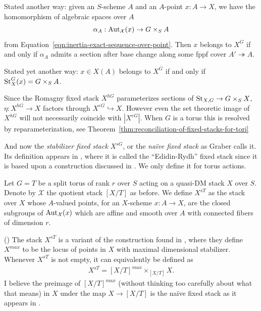 \documentclass[12pt,dvipsnames]{amsart}
\begin{document}
\begin{remark}\label{rl-001D}
  Stated another way: given an \(S\)-scheme \(A\) and an \(A\)-point \(x:A\to X\), we have the homomorphism of algebraic spaces over \(A\)
  \[\alpha_A:\operatorname{Aut}_{\mathcal X}(x) \to G\times_SA\]
  from Equation~\ref{eqn:inertia-exact-sequence-over-point}. Then \(x\) belongs to \(X^G\) if and only if \(\alpha_A\) admits a section after base change along some fppf cover \(A' \twoheadrightarrow A\).

  \bigskip
  
  \noindent Stated yet another way: \(x\in X(A)\) belongs to \(X^G\) if and only if \(\operatorname{St}^G_X(x) = G\times_S A\).
\end{remark}


Since the Romagny fixed stack $X^{hG}$ parameterizes sections of \(\operatorname{St}_{X,G} \to G\times_SX\), \(\eta:X^{hG} \to X\) factors through \(X^{eG}\hookrightarrow X\). However even the set theoretic image of \(X^{hG}\) will not necessarily coincide with \(|X^{eG}|\). When \(G\) is a torus this is resolved by reparameterization, see Theorem~\ref{thm:reconciliation-of-fixed-stacks-for-tori}


And now the \textit{stabilizer fixed stack} \(X^{sG}\), or the \textit{na\"ive fixed stack} as Graber calls it. Its definition appears in \cite{aranha-khan-latyntsev-etal_VirtualLocalizationRevisited2025}, where it is called the ``Edidin-Rydh'' fixed stack since it is based upon a construction discussed in \cite{edidin-rydh_CanonicalReductionStabilizers2021}. We only define it for torus actions.

\begin{definition}\label{rl-001E}\label{def:stabilizer-fixed-stack}
  Let \(G = T\) be a split torus of rank \(r\) over \(S\) acting on a quasi-DM stack \(X\) over \(S\). Denote by \(\mathcal X\) the quotient stack \([X/T]\) as before. We define \(X^{sT}\) as the stack over \(X\) whose \(A\)-valued points, for an \(X\)-scheme \(x:A\to X\), are the closed subgroups of \(\operatorname{Aut}_{\mathcal X}(x)\) which are affine and smooth over \(A\) with connected fibers of dimension \(r\).
\end{definition}

\begin{remark}\label{rl-001F}
(\cite[Remark A.44]{aranha-khan-latyntsev-etal_VirtualLocalizationRevisited2025})
  The stack \(X^{sT}\) is a variant of the construction found in \cite[Proposition C.5]{edidin-rydh_CanonicalReductionStabilizers2021}, where they define \(X^{max}\) to be the locus of points in \(X\) with maximal dimensional stabilizer. Whenever \(X^{sT}\) is not empty, it can equivalently be defined as
  \begin{align*}
    X^{sT} = [X/T]^{max} \times_{[X/T]} X.
  \end{align*}
  I believe the preimage of \([X/T]^{max}\) (without thinking too carefully about what that means) in \(X\) under the map \(X\to [X/T]\) is the na\"ive fixed stack as it appears in \cite{graber-pandharipande_LocalizationVirtualClasses1999}.
\end{remark}
\end{document}
